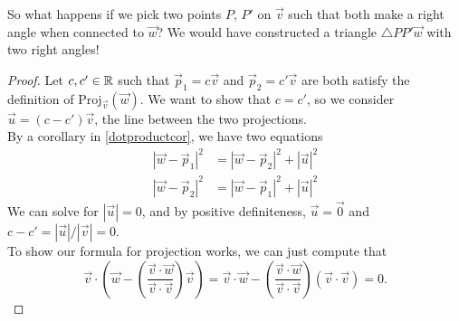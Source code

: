 So what happens if we pick two points $P$, $P'$ on $\vec{v}$ such that both make a right angle when connected to $\vec{w}$? We would have constructed a triangle $\triangle PP'\vec{w}$ with two right angles!
\begin{proof}
	Let $c, c'\in\mathbb{R}$ such that $\vec{p}_1=c\vec{v}$ and $\vec{p}_2=c'\vec{v}$ are both satisfy the definition of $\textrm{Proj}_{\vec{v}}({\vec{w}})$. We want to show that $c=c'$, so we consider $\vec{u}=(c-c')\vec{v}$, the line between the two projections.\\
	By a corollary in \ref{dotproductcor}, we have two equations \begin{align*}
	|\vec{w}-\vec{p}_1|^2&=|\vec{w}-\vec{p}_2|^2+|\vec{u}|^2 \\	
	|\vec{w}-\vec{p}_2|^2&=|\vec{w}-\vec{p}_1|^2+|\vec{u}|^2 
	\end{align*}
	We can solve for $|\vec{u}|=0$, and by positive definiteness, $\vec{u}=\vec{0}$ and $c-c' = |\vec{u}|/|\vec{v}| =0$.\\
	To show our formula for projection works, we can just compute that \[
	\vec{v} \cdot \left(\vec{w}-\left(\frac{\vec{v}\cdot{\vec{w}}}{\vec{v}\cdot\vec{v}}\right)\vec{v}\right)=\vec{v}\cdot\vec{w} -\left(\frac{\vec{v}\cdot\vec{w}}{\vec{v}\cdot\vec{v}}\right)(\vec{v}\cdot\vec{v})=0.
	\]
\end{proof}
\exercises
